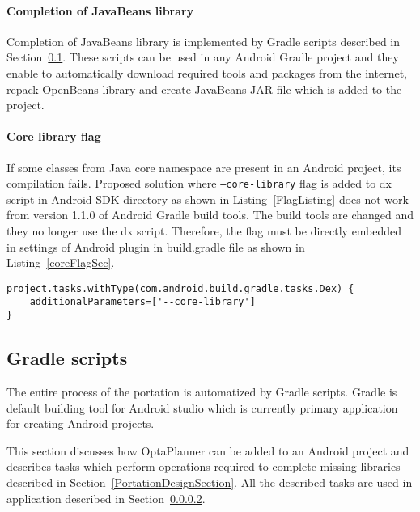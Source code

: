 \paragraph{Completion of JavaBeans library}
Completion of JavaBeans library is implemented by Gradle scripts described in Section~\ref{GradleScriptsSection}. These
scripts can be used in any Android Gradle project and they enable to automatically download required tools and packages
from the internet, repack OpenBeans library and create JavaBeans JAR file which is added to the project.

\paragraph{Core library flag}
If some classes from Java core namespace are present in an Android project, its compilation fails. Proposed
solution where \texttt{--core-library} flag is added to dx script in Android SDK directory as shown in
Listing~\ref{FlagListing} does not work from version 1.1.0 of Android Gradle build tools. The build tools are changed
and they no longer use the dx script. Therefore, the flag must be directly embedded in settings of Android plugin in
build.gradle file as shown in Listing~\ref{coreFlagSec}.
\\
\begin{lstlisting}[captionpos={b},caption={Addition of core library flag in build.gradle script},frame={lines},
label={coreFlagSec},basicstyle=\footnotesize]
project.tasks.withType(com.android.build.gradle.tasks.Dex) {
    additionalParameters=['--core-library']
}
\end{lstlisting}

\subsection{Gradle scripts}\label{GradleScriptsSection}
The entire process of the portation is automatized by Gradle scripts. Gradle is default building tool for Android studio
which is currently primary application for creating Android projects.

This section discusses how OptaPlanner can be added to an Android project and describes tasks which perform operations
required to complete missing libraries described in Section~\ref{PortationDesignSection}.  All the described tasks are
used in application described in Section~\ref{}. %

